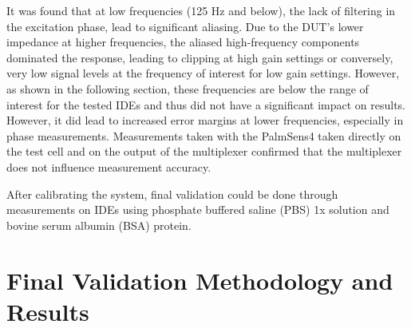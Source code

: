 It was found that at low frequencies (125 Hz and below), the lack of filtering in the excitation phase, lead to significant aliasing. Due to the \ac{DUT}'s lower impedance at higher frequencies, the aliased high-frequency components dominated the response, leading to clipping at high gain settings or conversely, very low signal levels at the frequency of interest for low gain settings. However, as shown in the following section, these frequencies are below the range of interest for the tested \acp{IDE} and thus did not have a significant impact on results. However, it did lead to increased error margins at lower frequencies, especially in phase measurements. Measurements taken with the PalmSens4 taken directly on the test cell and on the output of the multiplexer confirmed that the multiplexer does not influence measurement accuracy.

After calibrating the system, final validation could be done through measurements on \acp{IDE} using phosphate buffered saline (PBS) 1x solution and bovine serum albumin (BSA) protein.

\section{Final Validation Methodology and Results}

